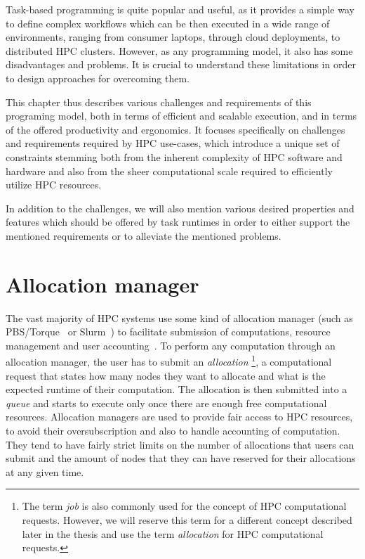 Task-based programming is quite popular and useful, as it provides a simple way to define complex
workflows which can be then executed in a wide range of environments, ranging from consumer
laptops, through cloud deployments, to distributed HPC clusters. However, as any programming model,
it also has some disadvantages and problems. It is crucial to understand these limitations in order
to design approaches for overcoming them.

This chapter thus describes various challenges and requirements of this programing model, both in
terms of efficient and scalable execution, and in terms of the offered productivity and ergonomics.
It focuses specifically on challenges and requirements required by HPC use-cases, which introduce a
unique set of constraints stemming both from the inherent complexity of HPC software and hardware
and also from the sheer computational scale required to efficiently utilize HPC resources.

In addition to the challenges, we will also mention various desired properties and features which
should be offered by task runtimes in order to either support the mentioned requirements or to
alleviate the mentioned problems.

\section{Allocation manager}
The vast majority of HPC systems use some kind of allocation manager (such as
PBS/Torque~\cite{pbs} or Slurm~\cite{slurm}) to facilitate submission
of computations, resource management and user accounting~\cite{slurm-schedmd}. To perform any
computation through an allocation manager, the user has to submit an \emph{allocation}
\footnote{The term \emph{job} is also commonly used for the concept of HPC computational
requests. However, we will reserve this term for a different concept described later in the thesis and use the term
\emph{allocation} for HPC computational requests.}, a computational request that states how many nodes they want to
allocate and what is the expected runtime of their computation. The allocation is then submitted
into a \emph{queue} and starts to execute only once there are enough free
computational resources. Allocation managers are used to provide fair access to HPC resources, to
avoid their oversubscription and also to handle accounting of computation. They tend to have fairly
strict limits on the number of allocations that users can submit and the amount of nodes that they
can have reserved for their allocations at any given time.

